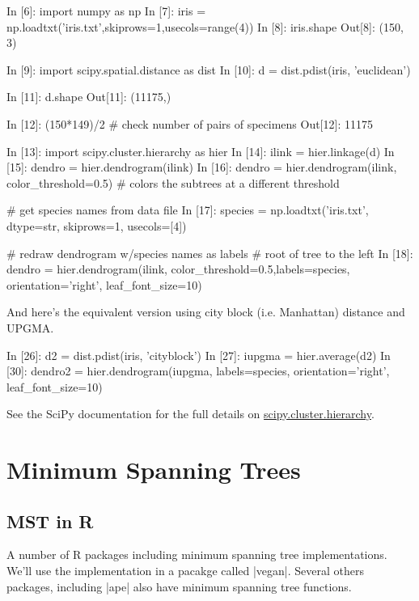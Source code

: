 \begin{python}
In [6]: import numpy as np
In [7]: iris = np.loadtxt('iris.txt',skiprows=1,usecols=range(4))
In [8]: iris.shape
Out[8]: (150, 3)

In [9]: import scipy.spatial.distance as dist
In [10]: d = dist.pdist(iris, 'euclidean')

In [11]: d.shape
Out[11]: (11175,)

In [12]: (150*149)/2  # check number of pairs of specimens
Out[12]: 11175

In [13]: import scipy.cluster.hierarchy as hier
In [14]: ilink = hier.linkage(d)
In [15]: dendro = hier.dendrogram(ilink)
In [16]: dendro = hier.dendrogram(ilink, color_threshold=0.5) # colors the subtrees at a different threshold

# get species names from data file
In [17]: species = np.loadtxt('iris.txt', dtype=str, skiprows=1, usecols=[4]) 

# redraw dendrogram w/species names as labels
# root of tree to the left
In [18]: dendro = hier.dendrogram(ilink, color_threshold=0.5,labels=species, orientation='right', leaf_font_size=10)
\end{python}

And here's the equivalent version using city block (i.e. Manhattan) distance and UPGMA.

\begin{python}
In [26]: d2 = dist.pdist(iris, 'cityblock')
In [27]: iupgma = hier.average(d2)
In [30]: dendro2 = hier.dendrogram(iupgma, labels=species, orientation='right', leaf_font_size=10)
\end{python}

See the SciPy documentation for the full details on \href{http://docs.scipy.org/doc/scipy/reference/cluster.hierarchy.html}{scipy.cluster.hierarchy}.


\section{Minimum Spanning Trees}

\subsection{MST in R}

A number of R packages including minimum spanning tree implementations.  We'll use the implementation in a pacakge called |vegan|.  Several others packages, including |ape| also have minimum spanning tree functions. 

